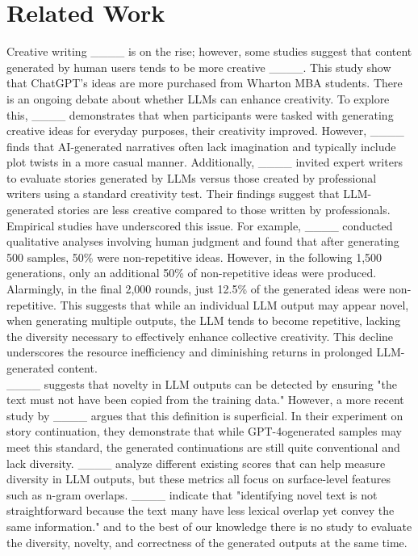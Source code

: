 \section{Related Work}
Creative writing ____ is on the rise; however, some studies suggest that content generated by human users tends to be more creative ____. This study show that ChatGPT's ideas are more purchased from Wharton MBA students. There is an ongoing debate about whether LLMs can enhance creativity. To explore this, ____ demonstrates that when participants were tasked with generating creative ideas for everyday purposes, their creativity improved. However, ____ finds that AI-generated narratives often lack imagination and typically include plot twists in a more casual manner. Additionally, ____ invited expert writers to evaluate stories generated by LLMs versus those created by professional writers using a standard creativity test. Their findings suggest that LLM-generated stories are less creative compared to those written by professionals.
Empirical studies have underscored this issue. For example, ____ conducted qualitative analyses involving human judgment and found that after generating 500 samples, 50\% were non-repetitive ideas. However, in the following 1,500 generations, only an additional 50\% of non-repetitive ideas were produced. Alarmingly, in the final 2,000 rounds, just 12.5\% of the generated ideas were non-repetitive. This suggests that while an individual LLM output may appear novel, when generating multiple outputs, the LLM tends to become repetitive, lacking the diversity necessary to effectively enhance collective creativity.
This decline underscores the resource inefficiency and diminishing returns in prolonged LLM-generated content. \\
____ suggests that novelty in LLM outputs can be detected by ensuring "the text must not have been copied from the training data." However, a more recent study by ____ argues that this definition is superficial. In their experiment on story continuation, they demonstrate that while GPT-4ogenerated samples may meet this standard, the generated continuations are still quite conventional and lack diversity.
____ analyze different existing scores that can help measure diversity in LLM outputs, but these metrics all focus on surface-level features such as n-gram overlaps. ____ indicate that "identifying novel text is not straightforward because the text many have less lexical overlap yet convey the same information." and to the best of our knowledge there is no study to evaluate the diversity, novelty, and correctness of the generated outputs at the same time.